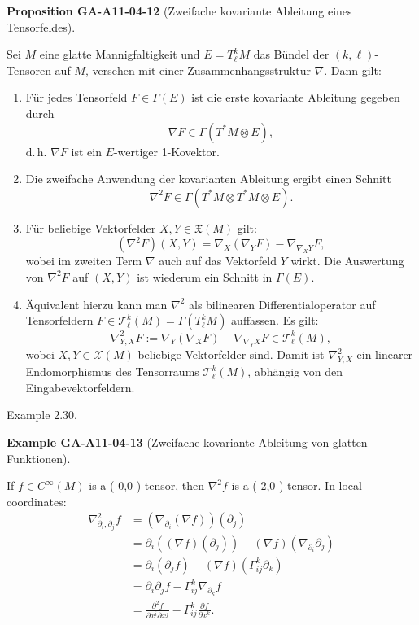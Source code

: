 \documentclass[10pt, letterpaper]{article}
\newcommand{\CustomHeading}[3]{%
  \par\medskip\noindent%
  \textbf{#1 #2} \textnormal{(#3)}.\enskip%
}
\newenvironment{PROP}[2]{\begin{unitbox}\CustomHeading{Proposition}{#1}{#2}}{\end{unitbox}}
\newenvironment{EXA}[2]{\begin{unitbox}\CustomHeading{Example}{#1}{#2}}{\end{unitbox}}
\begin{document}
\begin{PROP}{GA-A11-04-12}{Zweifache kovariante Ableitung eines Tensorfeldes}
Sei $M$ eine glatte Mannigfaltigkeit und $E = T^{k}_{\ell}M$ das Bündel der $(k,\ell)$-Tensoren auf $M$, versehen mit einer Zusammenhangsstruktur $\nabla$. Dann gilt:
\begin{enumerate}
  \item Für jedes Tensorfeld $F \in \Gamma(E)$ ist die erste kovariante Ableitung gegeben durch
  \[
  \nabla F \in \Gamma(T^*M \otimes E),
  \]
  d.\,h. $\nabla F$ ist ein $E$-wertiger 1-Kovektor.

  \item Die zweifache Anwendung der kovarianten Ableitung ergibt einen Schnitt
  \[
  \nabla^2 F \in \Gamma(T^*M \otimes T^*M \otimes E).
  \]

  \item Für beliebige Vektorfelder $X, Y \in \mathfrak{X}(M)$ gilt:
  \[
  \left(\nabla^2 F\right)(X, Y) 
  = \nabla_X \left( \nabla_Y F \right) - \nabla_{\nabla_X Y} F,
  \]
  wobei im zweiten Term $\nabla$ auch auf das Vektorfeld $Y$ wirkt. Die Auswertung von $\nabla^2 F$ auf $(X,Y)$ ist wiederum ein Schnitt in $\Gamma(E)$.

  \item Äquivalent hierzu kann man $\nabla^2$ als bilinearen Differentialoperator auf Tensorfeldern $F \in \mathscr{T}_{\ell}^{k}(M) = \Gamma(T^{k}_{\ell}M)$ auffassen. Es gilt:
  \[
  \nabla_{Y,X}^2 F := \nabla_Y(\nabla_X F) - \nabla_{\nabla_Y X} F \in \mathscr{T}_{\ell}^{k}(M),
  \]
  wobei $X, Y \in \mathscr{X}(M)$ beliebige Vektorfelder sind. Damit ist $\nabla_{Y,X}^2$ ein linearer Endomorphismus des Tensorraums $\mathscr{T}_{\ell}^{k}(M)$, abhängig von den Eingabevektorfeldern.
\end{enumerate}
\end{PROP}



Example 2.30. 


\begin{EXA}{GA-A11-04-13}{Zweifache kovariante Ableitung von glatten Funktionen}
If $f \in C^{\infty}(M)$ is a ( 0,0 )-tensor, then $\nabla^{2} f$ is a ( 2,0 )-tensor. In local coordinates:
$$
\begin{aligned}
\nabla_{\partial_{i}, \partial_{j}}^{2} f & =\left(\nabla_{\partial_{i}}(\nabla f)\right)\left(\partial_{j}\right) \\
& =\partial_{i}\left((\nabla f)\left(\partial_{j}\right)\right)-(\nabla f)\left(\nabla_{\partial_{i}} \partial_{j}\right) \\
& =\partial_{i}\left(\partial_{j} f\right)-(\nabla f)\left(\Gamma_{i j}^{k} \partial_{k}\right) \\
& =\partial_{i} \partial_{j} f-\Gamma_{i j}^{k} \nabla_{\partial_{k}} f \\
& =\frac{\partial^{2} f}{\partial x^{i} \partial x^{j}}-\Gamma_{i j}^{k} \frac{\partial f}{\partial x^{k}} .
\end{aligned}
$$
\end{EXA}
\end{document}
